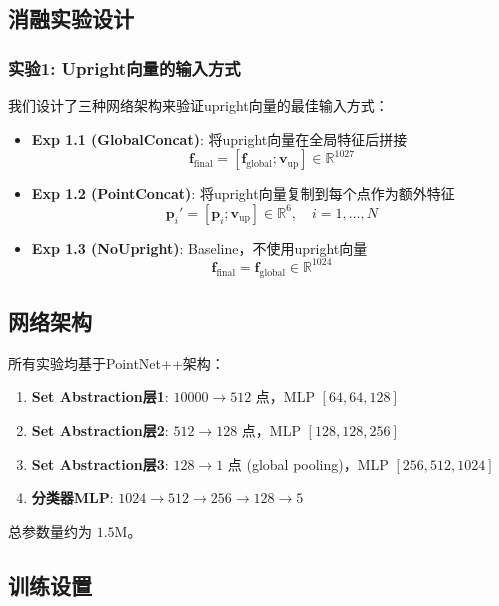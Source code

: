 \subsection{消融实验设计}

\subsubsection{实验1: Upright向量的输入方式}

我们设计了三种网络架构来验证upright向量的最佳输入方式：

\begin{itemize}
    \item \textbf{Exp 1.1 (GlobalConcat)}:
        将upright向量在全局特征后拼接
        $$\mathbf{f}_{\text{final}} = [\mathbf{f}_{\text{global}}; \mathbf{v}_{\text{up}}] \in \mathbb{R}^{1027}$$

    \item \textbf{Exp 1.2 (PointConcat)}:
        将upright向量复制到每个点作为额外特征
        $$\mathbf{p}_i' = [\mathbf{p}_i; \mathbf{v}_{\text{up}}] \in \mathbb{R}^{6}, \quad i=1,\ldots,N$$

    \item \textbf{Exp 1.3 (NoUpright)}:
        Baseline，不使用upright向量
        $$\mathbf{f}_{\text{final}} = \mathbf{f}_{\text{global}} \in \mathbb{R}^{1024}$$
\end{itemize}

\subsection{网络架构}

所有实验均基于PointNet++架构：

\begin{enumerate}
    \item \textbf{Set Abstraction层1}: $10000 \rightarrow 512$ 点，MLP $[64, 64, 128]$
    \item \textbf{Set Abstraction层2}: $512 \rightarrow 128$ 点，MLP $[128, 128, 256]$
    \item \textbf{Set Abstraction层3}: $128 \rightarrow 1$ 点 (global pooling)，MLP $[256, 512, 1024]$
    \item \textbf{分类器MLP}: $1024 \rightarrow 512 \rightarrow 256 \rightarrow 128 \rightarrow 5$
\end{enumerate}

总参数量约为 $1.5$M。

\subsection{训练设置}


